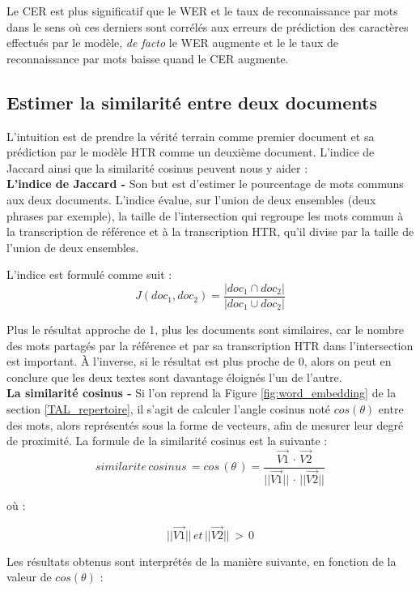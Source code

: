 Le CER est plus significatif que le WER et le taux de reconnaissance par mots dans le sens où ces derniers sont corrélés aux erreurs de prédiction des caractères effectués par le modèle, \textit{de facto} le WER augmente et le le taux de reconnaissance par mots baisse quand le CER augmente.

\subsection{Estimer la similarité entre deux documents}

L'intuition est de prendre la vérité terrain comme premier document et sa prédiction par le modèle HTR comme un deuxième document. L'indice de Jaccard ainsi que la similarité cosinus peuvent nous y aider :\\

\textbf{L'indice de Jaccard -} Son but est d'estimer le pourcentage de mots communs aux deux documents. L'indice évalue, sur l'union de deux ensembles (deux phrases par exemple), la taille de l'intersection qui regroupe les mots commun à la transcription de référence et à la transcription HTR, qu'il divise par la taille de l'union de deux ensembles.

L'indice est formulé comme suit : $$ J(doc_1,doc_2) = \frac{|doc_1 \cap doc_2|}{|doc_1 \cup doc_2|} $$

Plus le résultat approche de 1, plus les documents sont similaires, car le nombre des mots partagés par la référence et par sa transcription HTR dans l'intersection est important. À l'inverse, si le résultat est plus proche de 0, alors on peut en conclure que les deux textes sont davantage éloignés l'un de l'autre.\\

\textbf{La similarité cosinus -} Si l'on reprend la Figure \ref{fig:word_embedding} de la section \ref{TAL_repertoire}, il s'agit de calculer l'angle cosinus noté $cos(\theta)$ entre des mots, alors représentés sous la forme de vecteurs, afin de mesurer leur degré de proximité. La formule de la similarité cosinus est la suivante : $$ similarite\, cosinus \, = cos\, (\theta\,) = \frac{\overrightarrow{V1}\, \cdot \,\overrightarrow{V2}}{||\overrightarrow{V1}||\, \cdot \,||\overrightarrow{V2}||} $$

où : 

$$ ||\overrightarrow{V1}||\, et\, ||\overrightarrow{V2}||\, >\, 0 $$

\newpage
Les résultats obtenus sont interprétés de la manière suivante, en fonction de la valeur de $cos(\theta)$ :

